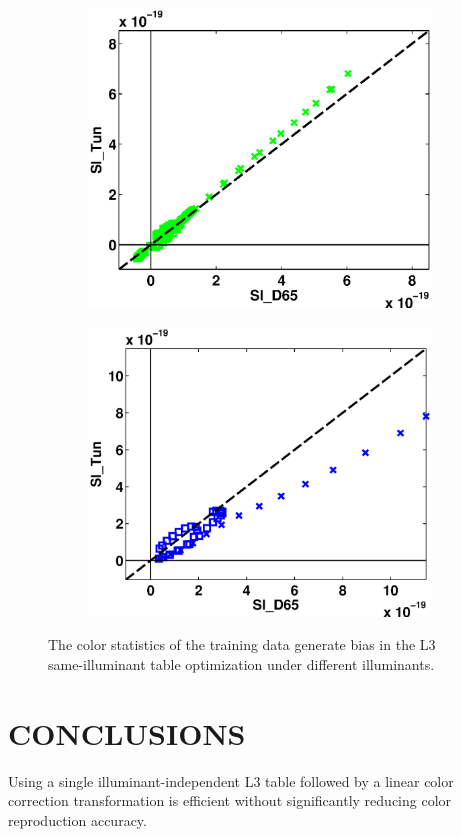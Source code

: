 \documentclass[]{spie}
\begin{document}
\begin{figure}
\begin{center}
\begin{subfigure}[b]{0.325\textwidth}
    \includegraphics[width=\textwidth]{color_Statistics_g}
\end{subfigure}
\begin{subfigure}[b]{0.325\textwidth}
    \includegraphics[width=\textwidth]{color_Statistics_b}
\end{subfigure}
\end{center}
\caption{The color statistics of the training data generate bias in the L3 same-illuminant table optimization under different illuminants.}
\label{fig:colorStatisticsPlot}
\end{figure}

\section{CONCLUSIONS}
Using a single illuminant-independent L3 table followed by a linear color correction transformation is efficient without significantly reducing color reproduction accuracy.  


% 
% 
\end{document}
